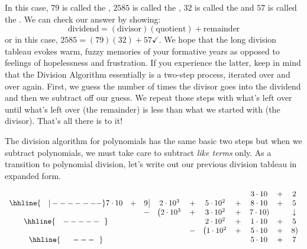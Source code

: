\setlength\arraycolsep{5pt}
\setlength\extrarowheight{0pt}

In this case, $79$ is called the , $2585$ is called the , $32$ is called the  and $57$ is called the .  We can check our answer by showing:  \[ \text{dividend} = (\text{divisor})( \text{quotient}) + \text{remainder}\] or in this case, $2585 = 
 (79)(32) + 57 \checkmark$.  We hope that the long division tableau evokes warm, fuzzy memories of your formative years as opposed to feelings of hopelessness and frustration.  If you experience the latter, keep in mind that the Division Algorithm essentially is a two-step process, iterated over and over again.  First, we guess the number of times the divisor goes into the dividend and  then we subtract off our guess.  We repeat those steps with what's left over until what's left over (the remainder) is less than what we started with (the divisor).  That's all there is to it!

\smallskip

The division algorithm for polynomials has the same basic two steps but when we subtract polynomials, we must take care to subtract \emph{like terms} only.  As a transition to polynomial division, let's write out our previous division tableau in expanded form.


\setlength\arraycolsep{0.1pt}
\setlength\extrarowheight{2pt}

\[ \begin{array}{cccccccccc}

& & & & & & & 3 \cdot 10 & + & 2 \\ \hhline{~~~|-------}

7 \cdot 10 & + & 9 \, \vline& 2\cdot 10^3 & + & 5 \cdot 10^2 & + & 8 \cdot 10 & + & 5 \\

 &  &  -& \left(2 \cdot 10^3 \right. & + &  3 \cdot 10^2  & + & \left. 7 \cdot 10 \right) &  &  \downarrow \\ \hhline{~~~-----~~} 
 &  &  &   &  & 2 \cdot 10^2 & +  & 1 \cdot 10 & + & 5 \\ 
 &  &  &   & - & \left(1 \cdot 10^2 \right. & +  &  5 \cdot 10 &  + &\left.  8 \right) \\ \hhline{~~~~~---~~} 
 &  &  &   &   &  & & 5 \cdot 10  & + & 7 \\

 
\end{array}\]

\setlength\arraycolsep{5pt}
\setlength\extrarowheight{0pt}

